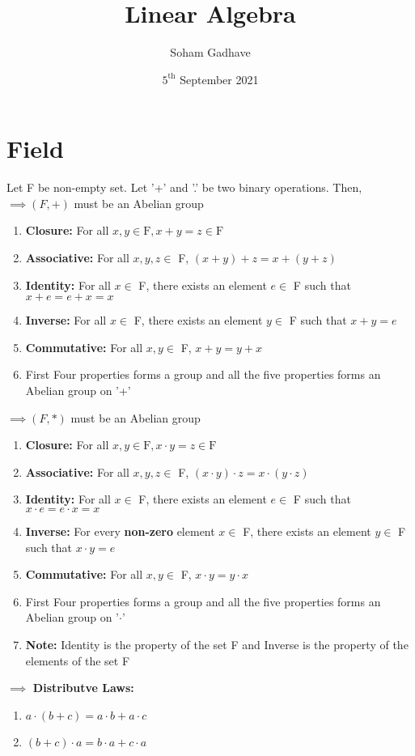 \documentclass[a4paper, titlepage]{article}
\title{Linear Algebra}
\author{Soham Gadhave}
\date{$5^{\text{th}}$ September 2021}
\begin{document}
\maketitle

\section{Field}

Let F be non-empty set. Let '+' and '.' be two binary operations. Then, \\
$\implies (F, +)$ must be an Abelian group 
\begin{enumerate}[label=\alph*]
    \item \textbf{Closure:} For all $ x, y \in \text{F}, x + y = z \in \text{F}$ 
    \item \textbf{Associative:} For all $x, y, z \in $ F, $(x + y) + z = x + (y + z)$
    \item \textbf{Identity:} For all $x \in $ F, there exists an element $e \in $ F such that $x + e = e + x = x$
    \item \textbf{Inverse:} For all $x \in $ F, there exists an element $y \in $ F such that $x + y = e$
    \item \textbf{Commutative:} For all $x, y \in $ F, $x + y = y + x$
    \item[] First Four properties forms a group and all the five properties forms an Abelian group on '+'
\end{enumerate}
$\implies (F, *)$ must be an Abelian group 
\begin{enumerate}[label=\alph*]
    \item \textbf{Closure:} For all $ x, y \in \text{F}, x \cdot y = z \in \text{F}$ 
    \item \textbf{Associative:} For all $x, y, z \in $ F, $(x \cdot y) \cdot z = x \cdot (y \cdot z)$
    \item \textbf{Identity:} For all $x \in $ F, there exists an element $e \in $ F such that $x \cdot e = e \cdot x = x$
    \item \textbf{Inverse:} For every \textbf{non-zero} element $x \in $ F, there exists an element $y \in $ F such that $x \cdot y = e$
    \item \textbf{Commutative:} For all $x, y \in $ F, $x \cdot y = y \cdot x$
    \item[] First Four properties forms a group and all the five properties forms an Abelian group on '$\cdot$'
    \item[] \textbf{Note:} Identity is the property of the set F and
    Inverse is the property of the elements of the set F \\
\end{enumerate}
$ \implies $ \textbf{Distributve Laws:}
    \begin{enumerate}
        \item $ a\cdot(b + c) = a\cdot b + a\cdot c $
        \item $ (b + c)\cdot a = b\cdot a + c\cdot a $
    \end{enumerate}
\end{document}
